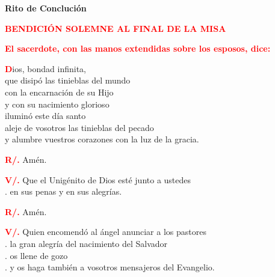 \documentclass[12pt, letterpaper]{report}
\begin{document}
\newpage

\begin{center}
\Huge {\bfseries Rito de Concluci\'on}
\end{center}

\Large {\bfseries \textcolor{red}{BENDICI\'ON SOLEMNE AL FINAL DE LA MISA}} \newline

\large{\bfseries \textcolor{red}{El sacerdote, con las manos extendidas sobre los esposos, dice:}}\newline

\lettrine[lines=1]{\bfseries \textcolor{red}{D}}{}\Large ios, bondad infinita, \\
que disip\'o las tinieblas del mundo \\
con la encarnaci\'on de su Hijo \\
y con su nacimiento glorioso \\
ilumin\'o este d\'ia santo \\
aleje de vosotros las tinieblas del pecado \\
y alumbre vuestros corazones con la luz de la gracia. \newline

\Large \hspace{-0.9cm} {\bfseries \textcolor{red}{R/.}} \hspace{0.5cm} Am\'en.\newline

\Large \hspace{-0.9cm} {\bfseries \textcolor{red}{V/.}} \hspace{0.5cm} Que el Unig\'enito de Dios est\'e junto a ustedes \\
. \hspace{1cm} en sus penas y en sus alegr\'ias. \newline

\Large \hspace{-0.9cm} {\bfseries \textcolor{red}{R/.}} \hspace{0.5cm} Am\'en.\newline

\Large \hspace{-0.9cm} {\bfseries \textcolor{red}{V/.}} \hspace{0.5cm} Quien encomend\'o al \'angel anunciar a los pastores \\
. \hspace{1cm} la gran alegr\'ia del nacimiento del Salvador \\
. \hspace{1cm} os llene de gozo \\
. \hspace{1cm} y os haga tambi\'en a vosotros mensajeros del Evangelio. \newline
\end{document}
